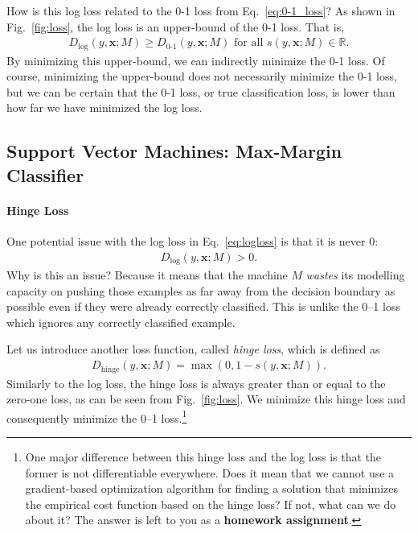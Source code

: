 \documentclass{report}
\newcommand{\vect}[1]{\mathbf{#1}}
\newcommand{\vx}[0]{\vect{x}}
\newcommand{\hinge}{\text{hinge}}
\begin{document}
How is this log loss related to the 0-1 loss from Eq.~\eqref{eq:0-1_loss}? As
shown in Fig.~\ref{fig:loss}, the log loss is an upper-bound of the 0-1 loss.
That is,
\begin{align*}
    D_{\log}(y, \vx; M) \geq D_{\text{0-1}}(y, \vx; M)\text{ for all }s(y, \vx;
    M) \in \mathbb{R}.
\end{align*}
By minimizing this upper-bound, we can indirectly minimize the 0-1 loss. Of
course, minimizing the upper-bound does not necessarily minimize the 0-1 loss,
but we can be certain that the 0-1 loss, or true classification loss, is lower
than how far we have minimized the log loss. 


\subsection{Support Vector Machines: Max-Margin Classifier}
\label{sec:svm}

\paragraph{Hinge Loss}

One potential issue with the log loss in Eq.~\eqref{eq:logloss} is that it is
never $0$: 
\begin{align*}
    D_{\log}(y, \vx; M) > 0.
\end{align*}
Why is this an issue? Because it means that the machine $M$ {\it wastes} its
modelling capacity on pushing those examples as far away from the decision
boundary as possible even if they were already correctly classified. This is
unlike the 0--1 loss which ignores any correctly classified example. 

Let us introduce another loss function, called {\it hinge loss}, which is
defined as
\begin{align*}
    D_{\hinge}(y, \vx; M) = \max(0, 1 - s(y, \vx; M)).
\end{align*}
Similarly to the log loss, the hinge loss is always greater than or equal to the
zero-one loss, as can be seen from Fig.~\ref{fig:loss}. We minimize this hinge
loss and consequently minimize the 0--1 loss.\footnote{
    One major difference between this hinge loss and the log loss is that the
    former is not differentiable everywhere. Does it mean that we cannot use a
    gradient-based optimization algorithm for finding a solution that minimizes
    the empirical cost function based on the hinge loss? If not, what can we do
    about it? The answer is left to you as a {\bf homework assignment}.
}
\end{document}
